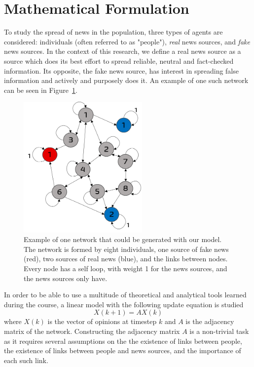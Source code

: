 \section{Mathematical Formulation}
\label{sec:mathematical}
To study the spread of news in the population, three types of agents are considered: individuals (often referred to as "people"), \textit{real} news sources, and \textit{fake} news sources. In the context of this research, we define a real news source as a source which does its best effort to spread reliable, neutral and fact-checked information. Its opposite, the fake news source, has interest in spreading false information and actively and purposely does it. An example of one such network can be seen in Figure~\ref{pics:network_example}.

\begin{figure}
\centering
\includegraphics[width=2.5in]{Figures/network_example.png}
\caption{Example of one network that could be generated with our model. The network is formed by eight individuals, one source of fake news (red), two sources of real news (blue), and the links between nodes. Every node has a self loop, with weight 1 for the news sources, and the news sources only have. }
\label{pics:network_example}
\end{figure}
In order to be able to use a multitude of theoretical and analytical tools learned during the course, a linear model with the following update equation is studied
\begin{equation}
X(k+1) = A X(k)
\end{equation}
where $X(k)$ is the vector of opinions at timestep $k$ and $A$ is the adjacency matrix of the network.
Constructing the adjacency matrix $A$ is a non-trivial task as it requires several assumptions on the the existence of links between people, the existence of links between people and news sources, and the importance of each such link.
